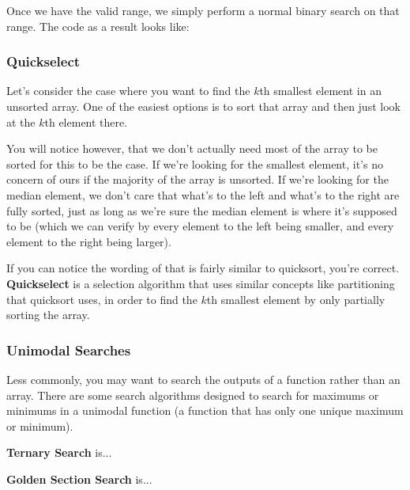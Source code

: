 Once we have the valid range, we simply perform a normal binary search on that range. The code as a result looks like:


\subsubsection{Quickselect}

Let's consider the case where you want to find the $k$th smallest element in an unsorted array. One of the easiest options is to sort that array and then just look at the $k$th element there.

You will notice however, that we don't actually need most of the array to be sorted for this to be the case. If we're looking for the smallest element, it's no concern of ours if the majority of the array is unsorted. If we're looking for the median element, we don't care that what's to the left and what's to the right are fully sorted, just as long as we're sure the median element is where it's supposed to be (which we can verify by every element to the left being smaller, and every element to the right being larger).

If you can notice the wording of that is fairly similar to quicksort, you're correct. \textbf{Quickselect} is a selection algorithm that uses similar concepts like partitioning that quicksort uses, in order to find the $k$th smallest element by only partially sorting the array.

\subsubsection{Unimodal Searches}

Less commonly, you may want to search the outputs of a function rather than an array. There are some search algorithms designed to search for maximums or minimums in a unimodal function (a function that has only one unique maximum or minimum).

\textbf{Ternary Search} is...

\textbf{Golden Section Search} is...